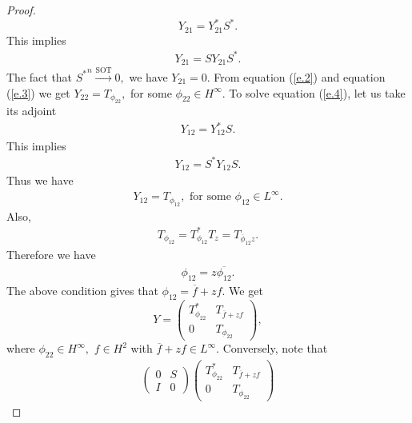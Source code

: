 \documentclass[12pt, reqno]{amsart}
\theoremstyle{definition}
\theoremstyle{remark}
\numberwithin{equation}{section}
\begin{document}
\begin{proof}
\begin{equation*}
            Y_{21}=Y^*_{21}S^*.
        \end{equation*}
        This implies
        \begin{align*}
             Y_{21}=SY_{21}S^* .
        \end{align*}
        The fact that ${S^*}^n \xrightarrow{\text{SOT}} 0,$ we have $Y_{21}=0.$ From equation (\ref{e.2}) and equation (\ref{e.3}) we get $Y_{22}=T_{\phi_{22}},$ for some $\phi_{22} \in H^\infty.$
         To solve equation (\ref{e.4}), let us take its adjoint
         \begin{align*}
           Y_{12}=Y^*_{12}S.
         \end{align*}
         This implies 
         \begin{align*}
              Y_{12}= S^*Y_{12}S.
         \end{align*}
         Thus we have 
         \begin{align*}
             Y_{12}=T_{\phi_{12}}, \text{ for some } \phi_{12} \in L^\infty.
         \end{align*}
         Also,
         \begin{align*}
             T_{\phi_{12}}=T^*_{\phi_{12}}T_z=T_{\overline \phi_{12}z}.
         \end{align*}
         Therefore we have
         \begin{align*}
             \phi_{12}=z\overline{\phi_{12}}.
         \end{align*}
         The above condition gives that $\phi_{12}=\overline{f}+zf.$
         We get
         \begin{equation*}
         Y=
             \begin{pmatrix}
                 T^*_{\phi_{22}}&T_{\overline{f}+zf}\\
                 0&T_{\phi_{22}}
             \end{pmatrix},
         \end{equation*}
         where $\phi_{22}\in H^\infty,$ $f \in H^2$ with ${\overline{f}+zf}\in L^\infty.$ Conversely, note that
         \begin{align*}
             \begin{pmatrix}
                 0&S\\
                I&0
            \end{pmatrix}
            \begin{pmatrix}
                 T^*_{\phi_{22}}&T_{\overline{f}+zf}\\
                 0&T_{\phi_{22}}
             \end{pmatrix}

\end{align*}
\end{proof}
\end{document}
